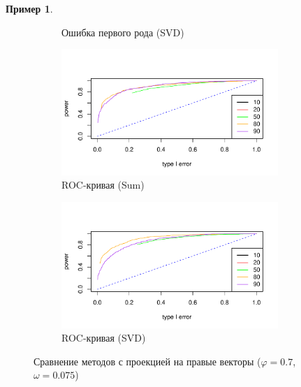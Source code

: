 \documentclass[specialist,
substylefile = spbu_report.rtx,
subf,href,colorlinks=true, 12pt]{disser}
\theoremstyle{definition}
\newtheorem{example}{Пример}
\begin{document}
\begin{example}
\begin{figure}[H]
\begin{subfigure}[t]{0.5\textwidth}
		\caption{Ошибка первого рода (SVD)}
	\end{subfigure}
	\bigskip
	\begin{subfigure}[t]{0.5\textwidth}
		\centering
		\includegraphics[width=0.9\textwidth]{img/roc_sum_fa_omega0075.pdf}
		\caption{ROC-кривая (Sum)}
		\label{fig:sum_fa_r}
	\end{subfigure}\hspace{\fill}
	\begin{subfigure}[t]{0.5\textwidth}
		\centering
		\includegraphics[width=0.9\textwidth]{img/roc_mssa_fa.pdf}
		\caption{ROC-кривая (SVD)}
	\end{subfigure}
	\caption{Сравнение методов с проекцией на правые векторы ($\varphi=0.7$, $\omega=0.075$)}
	\label{fig:sum_fa}
\end{figure}


\end{example}
\end{document}
